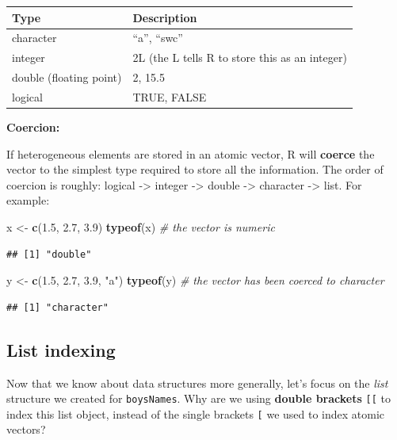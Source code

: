 \documentclass[
]{book}
\newenvironment{Shaded}{\begin{snugshade}}{\end{snugshade}}
\newcommand{\CommentTok}[1]{\textcolor[rgb]{0.56,0.35,0.01}{\textit{#1}}}
\newcommand{\FloatTok}[1]{\textcolor[rgb]{0.00,0.00,0.81}{#1}}
\newcommand{\KeywordTok}[1]{\textcolor[rgb]{0.13,0.29,0.53}{\textbf{#1}}}
\newcommand{\NormalTok}[1]{#1}
\newcommand{\StringTok}[1]{\textcolor[rgb]{0.31,0.60,0.02}{#1}}
\begin{document}
\begin{longtable}[]{@{}ll@{}}
\toprule
Type & Description\tabularnewline
\midrule
\endhead
character & ``a'', ``swc''\tabularnewline
integer & 2L (the L tells R to store this as an integer)\tabularnewline
double (floating point) & 2, 15.5\tabularnewline
logical & TRUE, FALSE\tabularnewline
\bottomrule
\end{longtable}

\textbf{Coercion:}

If heterogeneous elements are stored in an atomic vector, R will \textbf{coerce} the vector to the simplest type required to store all the information. The order of coercion is roughly: logical -\textgreater{} integer -\textgreater{} double -\textgreater{} character -\textgreater{} list. For example:

\begin{Shaded}
\begin{Highlighting}[]
\NormalTok{x \textless{}{-}}\StringTok{ }\KeywordTok{c}\NormalTok{(}\FloatTok{1.5}\NormalTok{, }\FloatTok{2.7}\NormalTok{, }\FloatTok{3.9}\NormalTok{)}
\KeywordTok{typeof}\NormalTok{(x) }\CommentTok{\# the vector is numeric}
\end{Highlighting}
\end{Shaded}

\begin{verbatim}
## [1] "double"
\end{verbatim}

\begin{Shaded}
\begin{Highlighting}[]
\NormalTok{y \textless{}{-}}\StringTok{ }\KeywordTok{c}\NormalTok{(}\FloatTok{1.5}\NormalTok{, }\FloatTok{2.7}\NormalTok{, }\FloatTok{3.9}\NormalTok{, }\StringTok{"a"}\NormalTok{)}
\KeywordTok{typeof}\NormalTok{(y) }\CommentTok{\# the vector has been coerced to character}
\end{Highlighting}
\end{Shaded}

\begin{verbatim}
## [1] "character"
\end{verbatim}

\hypertarget{list-indexing}{%
\subsection{List indexing}\label{list-indexing}}

Now that we know about data structures more generally, let's focus on the \emph{list} structure we created for \texttt{boysNames}. Why are we using \textbf{double brackets} \texttt{{[}{[}} to index this list object, instead of the single brackets \texttt{{[}} we used to index atomic vectors?
\end{document}
